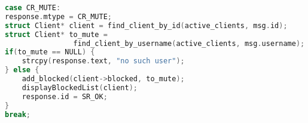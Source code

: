 \documentclass{article}
\begin{document}
	\begin{lstlisting}[language=c,
		numbersep=5pt,
		tabsize=2,
		showstringspaces=false]
case CR_MUTE:
response.mtype = CR_MUTE;
struct Client* client = find_client_by_id(active_clients, msg.id);
struct Client* to_mute = 
				find_client_by_username(active_clients, msg.username);
if(to_mute == NULL) {
	strcpy(response.text, "no such user");
} else {
	add_blocked(client->blocked, to_mute);
	displayBlockedList(client);
	response.id = SR_OK;
}
break;
	\end{lstlisting}
\end{document}
